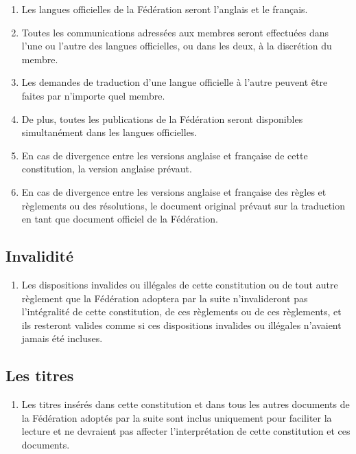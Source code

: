 \begin{enumerate}
 \item
  Les langues officielles de la Fédération seront l’anglais et le français.
 \item
  Toutes les communications adressées aux membres seront effectuées dans l'une ou l'autre des langues officielles, ou dans les deux, à la discrétion du membre.
 \item
  Les demandes de traduction d'une langue officielle à l'autre peuvent être faites par n'importe quel membre.
 \item
  De plus, toutes les publications de la Fédération seront disponibles simultanément dans les langues officielles.
 \item
  En cas de divergence entre les versions anglaise et française de cette constitution, la version anglaise prévaut.
 \item
  En cas de divergence entre les versions anglaise et française des règles et règlements ou des résolutions, le document original prévaut sur la traduction en tant que document officiel de la Fédération.
\end{enumerate}

\subsection{Invalidité}
\label{invalidite}

\begin{enumerate}
 \item
  Les dispositions invalides ou illégales de cette constitution ou de tout autre règlement que la Fédération adoptera par la suite n'invalideront pas l'intégralité de cette constitution, de ces règlements ou de ces règlements, et ils resteront valides comme si ces dispositions invalides ou illégales n'avaient jamais été incluses.
\end{enumerate}

\subsection{Les titres}
\label{les-titres}

\begin{enumerate}
 \item
  Les titres insérés dans cette constitution et dans tous les autres documents de la Fédération adoptés par la suite sont inclus uniquement pour faciliter la lecture et ne devraient pas affecter l'interprétation de cette constitution et ces documents.
\end{enumerate}

